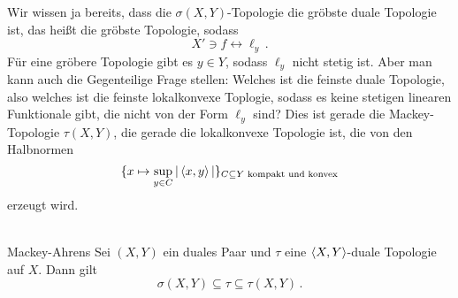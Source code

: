 \documentclass{article}
\begin{document}
	Wir wissen ja bereits, dass die $\sigma(X,Y)$-Topologie die gröbste duale Topologie ist, das heißt die gröbste Topologie, sodass
	\[X'\ni f\leftrightarrow \ell_y\,.\]
	Für eine gröbere Topologie gibt es $y\in Y$, sodass $\ell_y$ nicht stetig ist.
	Aber man kann auch die Gegenteilige Frage stellen: Welches ist die feinste duale Topologie, also welches ist die feinste lokalkonvexe Toplogie, sodass es keine stetigen linearen Funktionale gibt, die nicht von der Form $\ell_y$ sind?
	Dies ist gerade die Mackey-Topologie $\tau(X,Y)$, die gerade die lokalkonvexe Topologie ist, die von den Halbnormen
	\[\{x\mapsto \sup_{y\in C}|\left\langle x,y\right\rangle|\}_{C\subseteq Y\text{ kompakt und konvex}}\]
	erzeugt wird.\\
	\\
	\begin{Satz}{Mackey-Ahrens}{}
		Sei $(X,Y)$ ein duales Paar und $\tau$ eine $\left\langle X,Y\right\rangle$-duale Topologie auf $X$. Dann gilt
		\[\sigma(X,Y)\subseteq \tau\subseteq \tau(X,Y)\,.\]
	\end{Satz}
	

	
	
	
	
\end{document}
